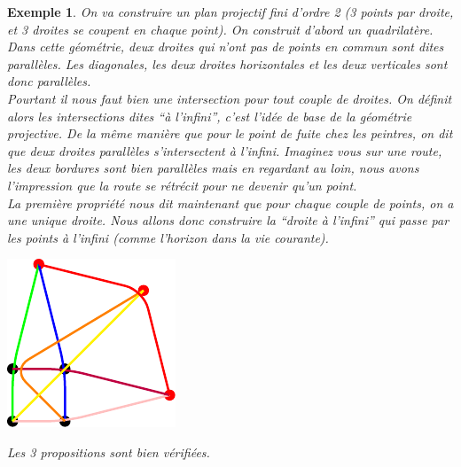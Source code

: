 \documentclass[a4paper]{article}
\newtheorem{Ex}{Exemple}[subsection]
\begin{document}
\begin{Ex}
  On va construire un plan projectif fini d'ordre 2 (3 points par droite, et 3 droites se coupent en chaque point). On construit d'abord un quadrilatère. Dans cette géométrie, deux droites qui n'ont pas de points en commun sont dites parallèles. Les diagonales, les deux droites horizontales et les deux verticales \vspace{1\baselineskip}sont donc parallèles.\\
  Pourtant il nous faut bien une intersection pour tout couple de droites. On définit alors les intersections dites ``à l'infini'', c'est l'idée de base de la géométrie projective. De la même manière que pour le point de fuite chez les peintres, on dit que deux droites parallèles s'intersectent à l'infini. Imaginez vous sur une route, les deux bordures sont bien parallèles mais en regardant au loin, nous avons l'impression que la route se rétrécit pour ne devenir\vspace{1\baselineskip} qu'un point.\\
La première propriété nous dit maintenant que pour chaque couple de points, on a une unique droite. Nous allons donc construire la ``droite à l'infini'' qui passe par les points à l'infini (comme l'horizon dans la vie courante).
\begin{center}
\includegraphics[scale=0.5]{test_tikz.pdf}
\end{center}
\vspace{2\baselineskip}
Les 3 propositions sont bien vérifiées.
\end{Ex}
\newpage
\end{document}
